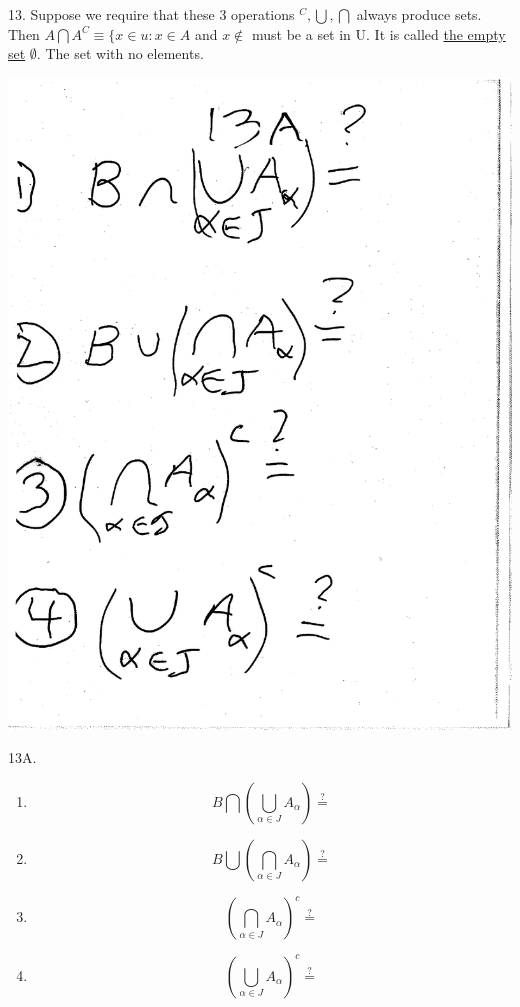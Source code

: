 \documentclass[10pt,a4paper]{article}
\begin{document}
13. Suppose we require that these 3 operations $^C , \bigcup , \bigcap$ always produce sets. Then $A \bigcap A^C \equiv \{ x \in u:x \in A$ and $x \notin $ must be a set in U. 
It is called \underline{the empty set} $\emptyset$. The set with no elements. 

\vspace{.20 in}

\includegraphics[scale=.5]{Pages/Page_13A}

13A. 
\begin{enumerate}
\item $$B \bigcap (\bigcup_{\alpha \in J} A_\alpha) \stackrel{?}{=}$$
\item $$B \bigcup (\bigcap_{\alpha \in J} A_\alpha) \stackrel{?}{=}$$
\item $$(\bigcap_{\alpha \in J} A_\alpha)^c \stackrel{?}{=}$$
\item $$(\bigcup_{\alpha \in J} A_\alpha)^c \stackrel{?}{=}$$
\end{enumerate}
\end{document}
